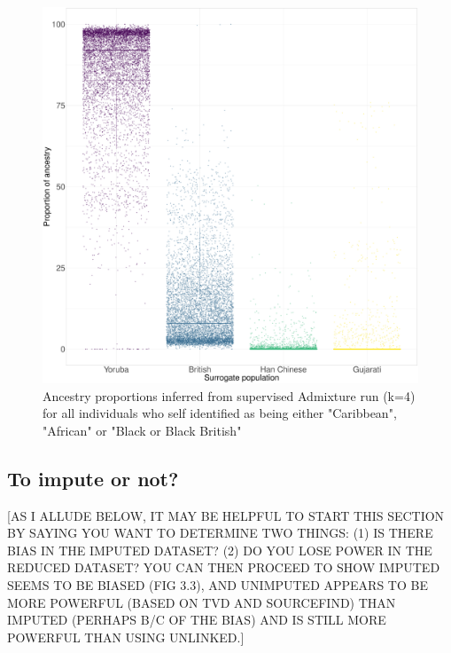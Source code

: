 {\begin{figure}[htp]
    \centering
    \includegraphics[width=1.0\textwidth]{../images/chapter3/African_Inds_proportions.pdf}
    \caption{Ancestry proportions inferred from supervised Admixture run (k=4) for all individuals who self identified as being either "Caribbean", "African" or "Black or Black British"}
    \label{fig:African_Inds_proportions_ADMIXTURE}
\end{figure}

\subsection{To impute or not?}

{\color{red}[AS I ALLUDE BELOW, IT MAY BE HELPFUL TO START THIS SECTION BY SAYING YOU WANT TO DETERMINE TWO THINGS: (1) IS THERE BIAS IN THE IMPUTED DATASET? (2) DO YOU LOSE POWER IN THE REDUCED DATASET? YOU CAN THEN PROCEED TO SHOW IMPUTED SEEMS TO BE BIASED (FIG 3.3), AND UNIMPUTED APPEARS TO BE MORE POWERFUL (BASED ON TVD AND SOURCEFIND) THAN IMPUTED (PERHAPS B/C OF THE BIAS) AND IS STILL MORE POWERFUL THAN USING UNLINKED.]}

}

